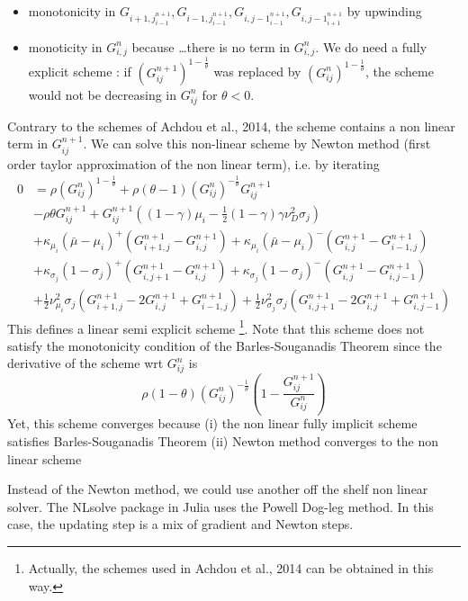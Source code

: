 \documentclass[english]{article}
\begin{document}
\begin{itemize}
	\item monotonicity in $G_{i+1, j}_{i-1}^{n+1}, G_{i-1, j}_{i-1}^{n+1}, G_{i, j-1}_{i-1}^{n+1}, G_{i, j-1}_{i+1}^{n+1}$ by upwinding 
	\item monoticity in $G_{i, j}^{n}$  because \dots there is  no term in $G_{i, j}^{n}$. We do need a fully explicit scheme : if $(G_{ij}^{n+1})^{1-\frac{1}{\theta}}$ was replaced  by $(G_{ij}^{n})^{1-\frac{1}{\theta}}$, the scheme would not be decreasing in $G_{ij}^{n}$ for $\theta < 0$.
\end{itemize}
Contrary to the schemes of Achdou et al., 2014,  the scheme contains a non linear term in $G_{ij}^{n+1}$. We can solve this non-linear scheme by Newton method (first order taylor approximation of the non linear term), i.e. by iterating
\begin{align*}
	0&= \rho (G_{ij}^{n})^{1-\frac{1}{\theta}}+ \rho  (\theta-1) (G_{ij}^{n})^{-\frac{1}{\theta}}G_{ij}^{n+1}\\
	&- \rho \theta G_{ij}^{{n+1}}+G_{ij}^{n+1}((1-\gamma)\mu_i-\frac{1}{2}(1-\gamma)\gamma\nu_D^2\sigma_j)\\
	&+\kappa_{\mu_i}(\bar{\mu}-\mu_i)^+(G_{i+1, j}^{n+1}-G_{i, j}^{n+1}) +\kappa_{\mu_i}(\bar{\mu}-\mu_i)^-(G_{i, j}^{n+1}-G_{i-1, j}^{n+1})\\
	&+\kappa_{\sigma_j}(1-\sigma_j)^+(G_{i, j+1}^{n+1}-G_{i,j}^{n+1}) +\kappa_{\sigma_j}(1-\sigma_j)^-(G_{i, j}^{n+1}-G_{i,j-1}^{n+1})\\
	&+\frac{1}{2}\nu_{\mu_i}^{2}\sigma_j(G_{i+1, j}^{n+1} - 2 G_{i, j}^{n+1} + G_{i-1, j}^{n+1})+\frac{1}{2}\nu_{\sigma_j}^{2}\sigma_j(G_{i, j+1}^{n+1} - 2 G_{i, j}^{n+1} + G_{i, j-1}^{n+1})
\end{align*}
This defines a linear semi explicit scheme \footnote{Actually, the schemes used in Achdou et al., 2014 can be obtained in this way.}. Note that this scheme does not satisfy the monotonicity condition of the Barles-Souganadis Theorem since the derivative of the scheme wrt $G_{ij}^{n}$ is 
$$\rho (1- \theta)(G_{ij}^{n})^{-\frac{1}{\theta}} (1- \frac{G_{ij}^{n+1}}{G_{ij}^{n}})$$
Yet, this scheme converges because (i) the non linear fully implicit scheme satisfies Barles-Souganadis Theorem (ii) Newton method converges to the non linear scheme


Instead of the Newton method, we could use another off the shelf non linear solver. The NLsolve package in Julia uses the Powell Dog-leg method. In this case, the updating step is a mix of gradient and Newton steps. 
\end{document}
